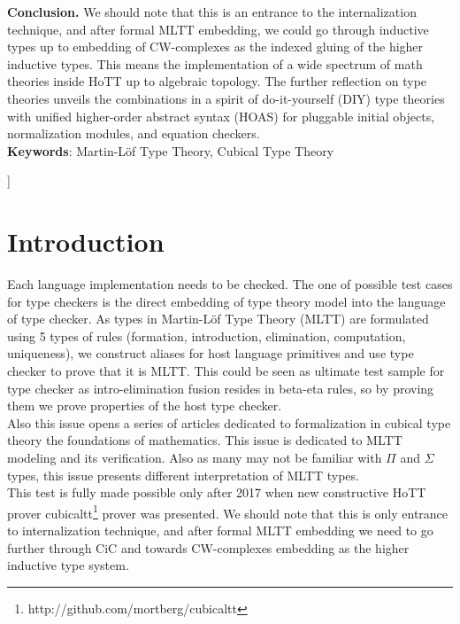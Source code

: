 \documentclass[twocolumn,10pt]{article}
\theoremstyle{definition}
\begin{document}
\begin{@twocolumnfalse}
{\bf Conclusion.} We should note that this is an entrance to the internalization
technique, and after formal MLTT embedding, we could go through
inductive types up to embedding of CW-complexes as the indexed
gluing of the higher inductive types. This means the implementation
of a wide spectrum of math theories inside HoTT up to algebraic topology.
The further reflection on type theories unveils the combinations in a
spirit of do-it-yourself (DIY) type theories with unified higher-order
abstract syntax (HOAS) for pluggable initial objects, normalization modules, and equation checkers.\\
{\bf Keywords}: Martin-Löf Type Theory, Cubical Type Theory
\vspace{1cm}

  \end{@twocolumnfalse}
]

\section*{Introduction}

Each language implementation needs to be checked. The one of possible test cases
for type checkers is the direct embedding of type theory model into the language of type checker.
As types in Martin-Löf Type Theory\cite{Lof72,Lof84} (MLTT) are formulated using 5 types of rules (formation,
introduction, elimination, computation, uniqueness), we construct aliases
for host language primitives and use type checker to prove that it is MLTT.
This could be seen as ultimate test sample for type checker as
intro-elimination fusion resides in beta-eta rules, so by proving them
we prove properties of the host type checker.\\
Also this issue opens a series of articles dedicated to formalization in
cubical type theory the foundations of mathematics. This issue is dedicated
to MLTT modeling and its verification. Also as many may not be familiar with
$\Pi$ and $\Sigma$ types, this issue presents different interpretation of MLTT types.\\
This test is fully made possible only after 2017 when new constructive HoTT\cite{HoTT13} prover cubicaltt\footnote{http://github.com/mortberg/cubicaltt}
prover was presented\cite{Mortberg17}. We should note that this is only entrance
to internalization technique, and after formal MLTT embedding we
need to go further through CiC\cite{Pfenning89,Dybjer94} and towards CW-complexes
embedding as the higher inductive type system.
\end{document}
